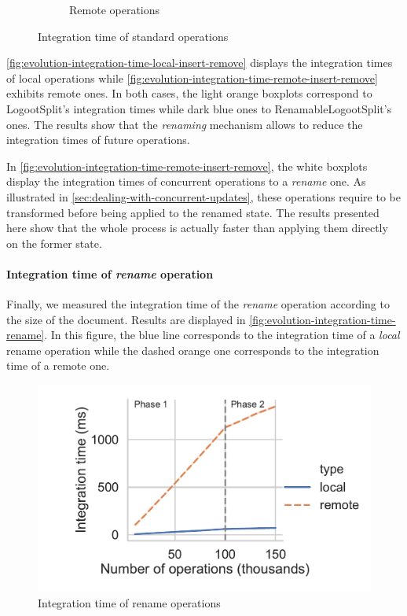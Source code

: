 \documentclass[sigplan,10pt]{acmart}
\begin{document}
\begin{figure}[ht!]
\begin{subfigure}{\columnwidth}
        \caption{Remote operations}
        \label{fig:evolution-integration-time-remote-insert-remove}
    \end{subfigure}
    \caption{Integration time of standard operations}
    \label{fig:evolution-integration-time-insert-remove}
\end{figure}

\autoref{fig:evolution-integration-time-local-insert-remove} displays the integration times of local operations while \autoref{fig:evolution-integration-time-remote-insert-remove} exhibits remote ones.
In both cases, the light orange boxplots correspond to LogootSplit's integration times while dark blue ones to RenamableLogootSplit's ones.
The results show that the \emph{renaming} mechanism allows to reduce the integration times of future operations.

In \autoref{fig:evolution-integration-time-remote-insert-remove}, the white boxplots display the integration times of concurrent operations to a \emph{rename} one.
As illustrated in \autoref{sec:dealing-with-concurrent-updates}, these operations require to be transformed before being applied to the renamed state.
The results presented here show that the whole process is actually faster than applying them directly on the former state.

\paragraph{Integration time of \emph{rename} operation}

Finally, we measured the integration time of the \emph{rename} operation according to the size of the document.
Results are displayed in \autoref{fig:evolution-integration-time-rename}.
In this figure, the blue line corresponds to the integration time of a \emph{local} rename operation while the dashed orange one corresponds to the integration time of a remote one.

\begin{figure}[ht!]
    \centering
    \includegraphics[width=\columnwidth]{img/integration-time-rename.pdf}
    \caption{Integration time of rename operations}
    \label{fig:evolution-integration-time-rename}
\end{figure}
\end{document}
